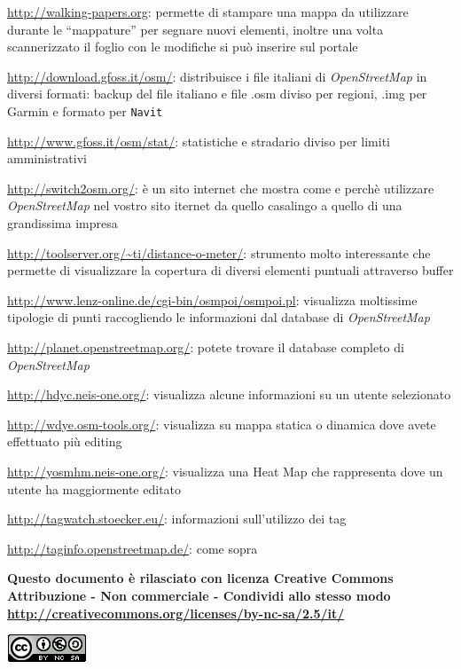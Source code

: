 \documentclass[a4paper,twoside,12pt,]{article}
\newcommand{\osm}{\emph{OpenStreetMap}\xspace}
\newcommand{\soft}[1]{\texttt{#1}}
\begin{document}
\url{http://walking-papers.org}: permette di stampare una mappa da utilizzare durante le ``mappature'' per segnare nuovi elementi, inoltre una volta scannerizzato il foglio con le modifiche si può inserire sul portale

\url{http://download.gfoss.it/osm/}: distribuisce i file italiani di \osm in diversi formati: backup del file italiano e file .osm diviso per regioni, .img per Garmin e formato per \soft{Navit}

\url{http://www.gfoss.it/osm/stat/}: statistiche e stradario diviso per limiti amministrativi

\url{http://switch2osm.org/}: è un sito internet che mostra come e perchè utilizzare \osm nel vostro sito iternet da quello casalingo a quello di una grandissima impresa

\url{http://toolserver.org/~ti/distance-o-meter/}: strumento molto interessante che permette di visualizzare la copertura di diversi elementi puntuali attraverso buffer

\url{http://www.lenz-online.de/cgi-bin/osmpoi/osmpoi.pl}: visualizza moltissime tipologie di punti raccogliendo le informazioni dal database di \osm

\url{http://planet.openstreetmap.org/}: potete trovare il database completo di \osm

\url{http://hdyc.neis-one.org/}: visualizza alcune informazioni su un utente selezionato

\url{http://wdye.osm-tools.org/}: visualizza su mappa statica o dinamica dove avete effettuato più editing

\url{http://yosmhm.neis-one.org/}: visualizza una Heat Map che rappresenta dove un utente ha maggiormente editato

\url{http://tagwatch.stoecker.eu/}: informazioni sull'utilizzo dei tag

\url{http://taginfo.openstreetmap.de/}: come sopra

\vfill
\begin{center}\begin{small}\textbf{
Questo documento è rilasciato con licenza 
Creative Commons Attribuzione - Non commerciale - Condividi allo stesso modo
\url{http://creativecommons.org/licenses/by-nc-sa/2.5/it/}}\end{small}\end{center}
\begin{center}
 \includegraphics{ccbysa.png}
\end{center}
\end{document}
